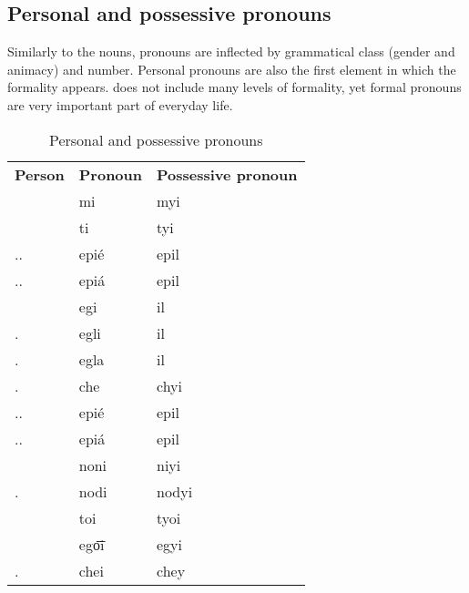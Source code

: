 \subsection{Personal and possessive pronouns}

Similarly to the nouns, pronouns are inflected by grammatical class (gender and
animacy) and number. Personal pronouns are also the first element in which the
formality appears. \andro does not include many levels of formality, yet formal
pronouns are very important part of everyday life.

\begin{table}[]
  \caption{Personal and possessive pronouns}
  \label{tab:pronouns}
  \begin{tabular}{lll}
    \textbf{Person}    & \textbf{Pronoun} & \textbf{Possessive pronoun} \\
    \Fsg{}             & mi               & myi                         \\
    \Ssg{}             & ti               & tyi                         \\
    \Ssg{}.\M{}.\Frm{} & epié             & epil                        \\
    \Ssg{}.\F{}.\Frm{} & epiá             & epil                        \\
    \Tsg{}             & egi              & il                          \\
    \Tsg{}.\M{}        & egli             & il                          \\
    \Tsg{}.\F{}        & egla             & il                          \\
    \Tsg{}.\Inan{}     & che              & chyi                        \\
    \Tsg{}.\M{}.\Frm{} & epié             & epil                        \\
    \Tsg{}.\F{}.\Frm{} & epiá             & epil                        \\
    \Fpl{}             & noni             & niyi                        \\
    \Fpl{}.\Excl{}     & nodi             & nodyi                       \\
    \Spl{}             & toi              & tyoi                        \\
    \Tpl{}             & ego͞i             & egyi                        \\
    \Tpl{}.\Inan{}     & chei             & chey
  \end{tabular}
\end{table}

